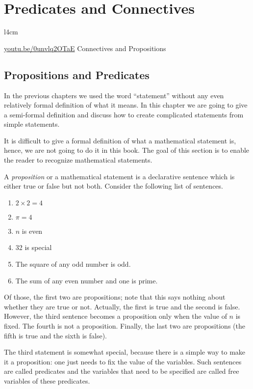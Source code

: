 \chapter{Predicates and Connectives}
\begin{wrapfigure}{l}{4cm}
  \begin{center}
    \vskip -0.5cm
    \vskip 0.25cm
    \href{https://youtu.be/0unvlq2OTaE}{youtu.be/0unvlq2OTaE}
    {\footnotesize Connectives and Propositions}
  \end{center}
  \vskip -0.5cm
\end{wrapfigure}

\section{Propositions and Predicates}
In the previous chapters we used the word ``statement'' without any even
relatively formal definition of what it means. In this chapter we are going to
give a semi-formal definition and discuss how to create complicated statements
from simple statements.

It is difficult to give a formal definition of what a mathematical statement is,
hence, we are not going to do it in this book. The goal of this section is to
enable the reader to recognize mathematical statements.

A \textit{proposition} or a mathematical statement is a declarative sentence
which is either true or false but not both. Consider the following list of
sentences.
\begin{enumerate}
  \item $2 \times 2 = 4$
  \item $\pi = 4$
  \item $n$ is even
  \item 32 is special
  \item The square of any odd number is odd.
  \item The sum of any even number and one is prime.
\end{enumerate}
Of those, the first two are propositions; note that this says nothing about whether they
are true or not. Actually, the first is true and the second is false.
However, the third sentence becomes a proposition only when the value
of $n$ is fixed. The fourth is not a proposition. Finally, the last
two are propositions (the fifth is true and the sixth is false).

The third statement is somewhat special, because there is a simple way to make
it a proposition: one just needs to fix the value of the variables. Such
sentences are called predicates and the variables that need to be specified are
called free variables of these predicates.

